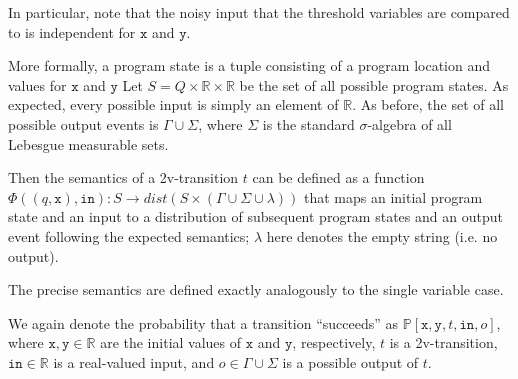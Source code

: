 \documentclass[12pt]{article}
\newcommand{\RR}{\mathbb{R}}
\newcommand{\PP}{\mathbb{P}}
\theoremstyle{definition}
\begin{document}
In particular, note that the noisy input that the threshold variables are compared to is independent for $\texttt{x}$ and $\texttt{y}$.

More formally, a program state is a tuple consisting of a program location and values for $\texttt{x}$ and $\texttt{y}$ Let $S = Q\times\RR\times \RR$ be the set of all possible program states. As expected, every possible input is simply an element of $\RR$. 
As before, the set of all possible output events is $\Gamma \cup \Sigma$, where $\Sigma$ is the standard $\sigma$-algebra of all Lebesgue measurable sets. 

Then the semantics of a 2v-transition $t$ can be defined as a function $\Phi((q, \texttt{x}), \texttt{in}): S\to dist(S\times (\Gamma\cup\Sigma\cup \lambda))$ that maps an initial program state and an input to a distribution of subsequent program states and an output event following the expected semantics; $\lambda$ here denotes the empty string (i.e. no output). 

The precise semantics are defined exactly analogously to the single variable case. 

We again denote the probability that a transition ``succeeds'' as $\PP[\texttt{x}, \texttt{y}, t, \texttt{in}, o]$, where $\texttt{x}, \texttt{y}\in \RR$ are the initial values of $\texttt{x}$ and $\texttt{y}$, respectively, $t$ is a 2v-transition, $\texttt{in}\in \RR$ is a real-valued input, and $o\in \Gamma\cup\Sigma$ is a possible output of $t$.
\end{document}
